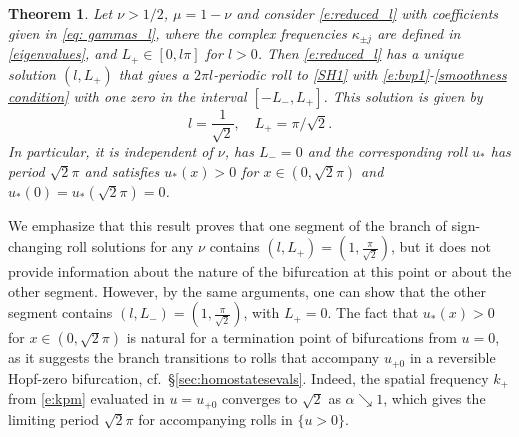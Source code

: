 \documentclass{article}
\numberwithin{equation}{section}
\newtheorem{theorem}{Theorem}[section]
\begin{document}
		\begin{theorem}\label{thm:lowl}
			Let $\nu > 1/2$, $\mu = 1-\nu$ and consider \eqref{e:reduced_l} with coefficients given in \eqref{eq: gammas_l}, where the complex frequencies $\kappa_{\pm j}$ are defined in \eqref{eigenvalues}, and $L_+ \in [0,l\pi]$ for $l>0$. Then \eqref{e:reduced_l} has a unique solution $(l, L_+)$ that gives a $2\pi l$-periodic roll to \eqref{SH1} with \eqref{e:bvp1}-\eqref{smoothness condition} with one zero in the interval $[-L_-,L_+]$. This solution is given by
			\begin{equation}
				l = \frac{1}{\sqrt{2}}, \quad L_+ = \pi/\sqrt{2}.
			\end{equation}
			In particular, it is independent of $\nu$, has $L_- = 0$ and the corresponding roll $u_*$ has period $\sqrt{2}\pi$ and satisfies $u_*(x)>0$ for $x\in(0,\sqrt{2}\pi)$ and $u_*(0)=u_*(\sqrt{2}\pi)=0$.
		 \end{theorem}

We emphasize that this result proves that one segment of the branch of sign-changing roll solutions for any $\nu$ contains $(l,L_+)=\left(1,\frac{\pi}{\sqrt{2}}\right)$, but it does not provide information about the nature of the bifurcation at this point or about the other segment. However, by the same arguments, one can show that the other segment contains $(l,L_-)=\left(1,\frac{\pi}{\sqrt{2}}\right)$, with $L_+=0$. 
The fact that $u_*(x)>0$ for $x\in(0,\sqrt{2}\pi)$ is natural for a termination point of  bifurcations from $u=0$, as it suggests the branch transitions to rolls that accompany $u_{+0}$ in a reversible Hopf-zero bifurcation, cf.\ \S\ref{sec:homostatesevals}. Indeed, the spatial frequency $k_+$ from \eqref{e:kpm} evaluated in $u=u_{+0}$ converges to $\sqrt{2}$ as $\alpha\searrow 1$, which gives the limiting period $\sqrt{2}\pi$ for accompanying rolls in $\{u>0\}$. 
\end{document}
